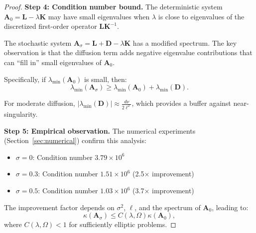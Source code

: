 \documentclass[11pt,a4paper]{article}
\newcommand{\bA}{\mathbf{A}}
\newcommand{\bK}{\mathbf{K}}
\newcommand{\bL}{\mathbf{L}}
\newcommand{\bD}{\mathbf{D}}
\begin{document}
\begin{proof}
\textbf{Step 4: Condition number bound.}
The deterministic system $\bA_0 = \bL - \lambda\bK$ may have small eigenvalues when $\lambda$ is close to eigenvalues of the discretized first-order operator $\bL \bK^{-1}$.

The stochastic system $\bA_\sigma = \bL + \bD - \lambda\bK$ has a modified spectrum. The key observation is that the diffusion term adds negative eigenvalue contributions that can ``fill in'' small eigenvalues of $\bA_0$.

Specifically, if $\lambda_{\min}(\bA_0)$ is small, then:
\begin{equation}
\lambda_{\min}(\bA_\sigma) \geq \lambda_{\min}(\bA_0) + \lambda_{\min}(\bD).
\end{equation}

For moderate diffusion, $|\lambda_{\min}(\bD)| \approx \frac{d\nu}{2\ell^2}$, which provides a buffer against near-singularity.

\textbf{Step 5: Empirical observation.}
The numerical experiments (Section~\ref{sec:numerical}) confirm this analysis:
\begin{itemize}
\item $\sigma = 0$: Condition number $3.79 \times 10^6$
\item $\sigma = 0.3$: Condition number $1.51 \times 10^6$ (2.5$\times$ improvement)
\item $\sigma = 0.5$: Condition number $1.03 \times 10^6$ (3.7$\times$ improvement)
\end{itemize}

The improvement factor depends on $\sigma^2$, $\ell$, and the spectrum of $\bA_0$, leading to:
\begin{equation}
\kappa(\bA_\sigma) \leq C(\lambda, \Omega) \kappa(\bA_0),
\end{equation}
where $C(\lambda, \Omega) < 1$ for sufficiently elliptic problems.
\end{proof}
\end{document}
